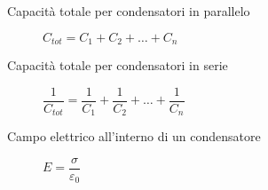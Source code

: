 \documentclass[a4paper,11pt,italian]{article}
\begin{document}
\begin{description}
  \item[Capacità totale per condensatori in parallelo] 
  $ C_{tot} = C_1 + C_2 + \ldots + C_n $ 
%

  \item[Capacità totale per condensatori in serie] 
  $ \dfrac{1}{C_{tot}} = \dfrac{1}{C_1} + \dfrac{1}{C_2} + \ldots + \dfrac{1}{C_n}  $
%   
  
  \item[Campo elettrico all'interno di un condensatore]
  $ E = \dfrac{\sigma}{\varepsilon_0} $
  
\end{description}
\end{document}
